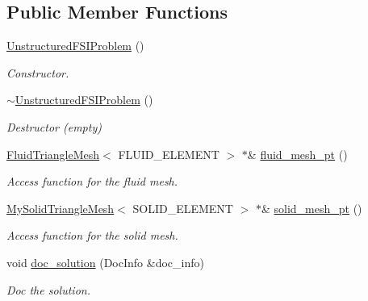 \subsection*{Public Member Functions}
\begin{DoxyCompactItemize}
\item 
\hyperlink{classUnstructuredFSIProblem_a6a31fd839e0215ef1312942cf7284bd2}{Unstructured\+F\+S\+I\+Problem} ()
\begin{DoxyCompactList}\small\item\em Constructor. \end{DoxyCompactList}\item 
\hyperlink{classUnstructuredFSIProblem_a976a81e0dee902f6713bd8ca4d79d000}{$\sim$\+Unstructured\+F\+S\+I\+Problem} ()
\begin{DoxyCompactList}\small\item\em Destructor (empty) \end{DoxyCompactList}\item 
\hyperlink{classFluidTriangleMesh}{Fluid\+Triangle\+Mesh}$<$ F\+L\+U\+I\+D\+\_\+\+E\+L\+E\+M\+E\+NT $>$ $\ast$\& \hyperlink{classUnstructuredFSIProblem_afe86a739cadf57036a0bf351ed9bc1a9}{fluid\+\_\+mesh\+\_\+pt} ()
\begin{DoxyCompactList}\small\item\em Access function for the fluid mesh. \end{DoxyCompactList}\item 
\hyperlink{classMySolidTriangleMesh}{My\+Solid\+Triangle\+Mesh}$<$ S\+O\+L\+I\+D\+\_\+\+E\+L\+E\+M\+E\+NT $>$ $\ast$\& \hyperlink{classUnstructuredFSIProblem_ad1430c627842b8ea0a373adcf571647f}{solid\+\_\+mesh\+\_\+pt} ()
\begin{DoxyCompactList}\small\item\em Access function for the solid mesh. \end{DoxyCompactList}\item 
void \hyperlink{classUnstructuredFSIProblem_a15f581318b505de07f50bd570da8c8d0}{doc\+\_\+solution} (Doc\+Info \&doc\+\_\+info)
\begin{DoxyCompactList}\small\item\em Doc the solution. \end{DoxyCompactList}\end{DoxyCompactItemize}
